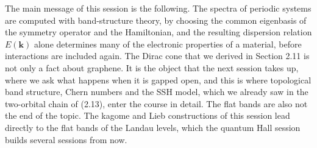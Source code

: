 The main message of this session is the following. The spectra of periodic systems are computed with
band-structure theory, by choosing the common eigenbasis of the symmetry operator and the Hamiltonian,
and the resulting dispersion relation $E(\mathbf{k})$ alone determines many of the electronic
properties of a material, before interactions are included again. The Dirac cone that we derived in
Section 2.11 is not only a fact about graphene. It is the object that the next session takes up, where
we ask what happens when it is gapped open, and this is where topological band structure, Chern
numbers and the SSH model, which we already saw in the two-orbital chain of (2.13), enter the course
in detail. The flat bands are also not the end of the topic. The kagome and Lieb constructions of
this session lead directly to the flat bands of the Landau levels, which the quantum Hall session
builds several sessions from now.
